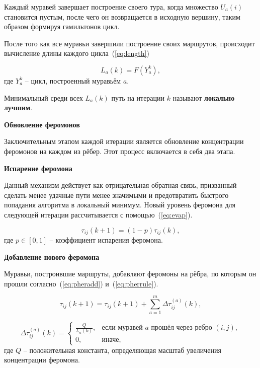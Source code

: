Каждый муравей завершает построение своего тура, когда множество $U_a(i)$ становится пустым, после чего он возвращается в исходную вершину, таким образом формируя гамильтонов цикл.

После того как все муравьи завершили построение своих маршрутов, происходит вычисление длины каждого цикла~(\ref{eq:length})

\begin{equation}
L_a(k) = F(Y^k_a),
\label{eq:length}
\end{equation}
где $Y^k_a$ -- цикл, построенный муравьём $a$.

Минимальный среди всех $L_a(k)$ путь на итерации $k$ называют \textbf{локально лучшим}.
\clearpage

\textbf{Обновление феромонов}

Заключительным этапом каждой итерации является обновление концентрации феромонов на каждом из рёбер. Этот процесс включается в себя два этапа.

\textbf{Испарение феромона}

Данный механизм действует как отрицательная обратная связь, призванный сделать менее удачные пути менее значимыми и предотвратить быстрого попадания алгоритма в локальный минимум. Новый уровень феромона для следующей итерации рассчитывается с помощью~(\ref{eq:evap}).

\begin{equation}
	\tau_{ij}(k + 1) = (1 - p)\tau_{ij}(k),
	\label{eq:evap}
\end{equation}
где $p \in [0, 1]$ -- коэффициент испарения феромона.

\textbf{Добавление нового феромона}

Муравьи, построившие маршруты, добавляют феромоны на рёбра, по которым он прошли согласно~(\ref{eq:pheradd}) и~(\ref{eq:pherrule}).

\begin{equation}
	\tau_{ij}(k+1) = \tau_{ij}(k+1) + \sum_{a=1}^{m} \Delta \tau_{ij}^{(a)}(k), 
	\label{eq:pheradd}
\end{equation}

\begin{equation}
	\Delta \tau_{ij}^{(a)}(k) = 
	\begin{cases}
		\displaystyle \frac{Q}{L_a(k)}, & \text{если муравей } a \text{ прошёл через ребро } (i,j), \\[1ex]
		0, & \text{иначе},
	\end{cases}
	\label{eq:pherrule}
\end{equation}
где $Q$ -- положительная константа, определяющая масштаб увеличения концентрации феромона.

